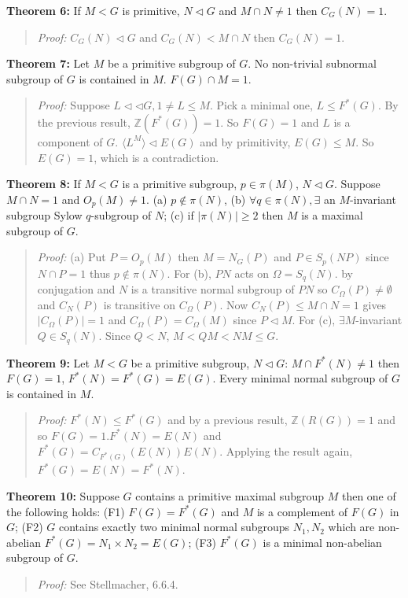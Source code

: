 {\bf Theorem 6:}
If $M<G$ is primitive, $N \lhd G$ and $M \cap N \neq 1$ then $C_G(N) =1$.
\begin{quote}
\emph{Proof:}  
$C_G(N) \lhd G$ and $C_G(N) < M \cap N$ then $C_G(N)=1$.
\end{quote}
{\bf Theorem 7:}
Let $M$ be a primitive subgroup of $G$.  No non-trivial subnormal subgroup of $G$ is contained in $M$.
$F(G) \cap M = 1$.
\begin{quote}
\emph{Proof:}  
Suppose $L \lhd \lhd G, 1 \neq L \leq M$.  Pick a minimal one, $L \leq F^*(G)$.  By the previous result,
${\mathbb Z}(F^*(G)) = 1$.  So $F(G)=1$ and $L$ is a component of $G$.
$\langle L^M \rangle \lhd E(G)$ and by primitivity, $E(G) \leq M$.  So $E(G)=1$, which is a contradiction.
\end{quote}
{\bf Theorem 8:}
If $M<G$ is a primitive subgroup, $p \in \pi(M)$, $N \lhd G$.  Suppose $M \cap N =1$ and $O_p(M) \neq 1$.
(a) $p \notin \pi(N)$, (b) $\forall q \in \pi(N), \exists$ an $M$-invariant subgroup Sylow $q$-subgroup
of $N$; (c) if $|\pi(N)| \geq 2$ then $M$ is a maximal subgroup of $G$.
\begin{quote}
\emph{Proof:}  
(a) Put $P= O_p(M)$ then $M= N_G(P)$ and $P \in S_p(NP)$ since $N \cap P = 1$ thus $p \notin \pi(N)$.
For (b), $PN$ acts on $\Omega= S_q(N)$. by conjugation and $N$ is a transitive normal subgroup of $PN$ so
$C_{\Omega}(P) \neq \emptyset$ and $C_N(P)$ is transitive on $C_{\Omega}(P)$.  Now $C_N(P) \leq M \cap N =1$ gives
$|C_{\Omega}(P)|=1$ and $C_{\Omega}(P)= C_{\Omega}(M)$ since $P \lhd M$.
For (c), $\exists M$-invariant $Q \in S_q(N)$.  Since $Q < N$, $M < QM < NM \leq G$.
\end{quote}
{\bf Theorem 9:}
Let $M<G$ be a primitive subgroup, $N \lhd G$: $M \cap F^*(N) \neq 1$ then
$F(G)=1$, $F^*(N)=F^*(G)= E(G)$. Every minimal normal subgroup of $G$ is contained in $M$.
\begin{quote}
\emph{Proof:}  
$F^*(N) \leq F^*(G)$ and by a previous result, ${\mathbb Z}(R(G)) =1$ and so $F(G)=1$.$F^*(N)=E(N)$ and
$F^*(G)= C_{F^*(G)}(E(N))E(N)$.  Applying the result again,
$F^*(G)= E(N)= F^*(N)$.
\end{quote}
{\bf Theorem 10:}
Suppose $G$ contains a primitive maximal subgroup $M$ then one of the following holds:
(F1) $F(G)=F^*(G)$ and $M$ is a complement of $F(G)$ in $G$;
(F2) $G$ contains exactly two minimal normal subgroups $N_1, N_2$ which are non-abelian
$F^*(G)= N_1 \times N_2= E(G)$; (F3) $F^*(G)$ is a minimal non-abelian subgroup of $G$.
\begin{quote}
\emph{Proof:}  
See Stellmacher, 6.6.4.
\end{quote}
